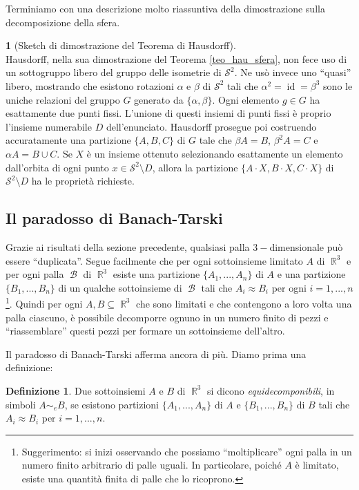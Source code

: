 \documentclass[12pt,a4paper]{report}
\theoremstyle{definition}
\newtheorem{defn}[teo]{Definizione}  %
\theoremstyle{num.custom-title}
\newtheorem{teo_custom-title}[teo]{} %
\DeclareMathOperator{\id}{id}
\DeclareMathOperator{\B}{\mathcal{B}}
\DeclareMathOperator{\R}{\mathbb{R}}
\DeclareMathOperator{\sm}{\setminus}
\renewcommand{\S}{\mathcal{S}}
\begin{document}
Terminiamo con una descrizione molto riassuntiva della dimostrazione sulla decomposizione della sfera.

\begin{teo_custom-title}[Sketch di dimostrazione del Teorema di Hausdorff]\ \\
Hausdorff, nella sua dimostrazione del Teorema \ref{teo_hau_sfera}, non fece uso di un sottogruppo libero del gruppo delle isometrie di $\S^2$. Ne usò invece uno ``quasi'' libero, mostrando che esistono rotazioni $\alpha$ e $\beta$ di $\S^2$ tali che $\alpha^2=\id=\beta^3$ sono le uniche relazioni del gruppo $G$ generato da $\{\alpha,\beta\}$. Ogni elemento $g \in G$ ha esattamente due punti fissi. L'unione di questi insiemi di punti fissi è proprio l'insieme numerabile $D$ dell'enunciato. Hausdorff prosegue poi costruendo accuratamente una partizione $\{A,B,C\}$ di $G$ tale che $\beta A = B$, $\beta^2 A = C$ e $\alpha A = B \cup C$. Se $X$ è un insieme ottenuto selezionando esattamente un elemento dall'orbita di ogni punto $x \in \S^2 \sm D$, allora la partizione $\{A \cdot X, B \cdot X, C \cdot X\}$ di $\S^2 \sm D$ ha le proprietà richieste.
\end{teo_custom-title}

\subsection{Il paradosso di Banach-Tarski}

Grazie ai risultati della sezione precedente, qualsiasi palla $3-$dimensionale può essere ``duplicata''. Segue facilmente che per ogni sottoinsieme limitato $A$ di $\R^3$ e per ogni palla $\B$ di $\R^3$ esiste una partizione $\{A_1,...,A_n\}$ di $A$ e una partizione $\{B_1,...,B_n\}$ di un qualche sottoinsieme di $\B$ tali che $A_i \approx B_i$ per ogni $i=1,...,n$ \footnote{Suggerimento: si inizi osservando che possiamo ``moltiplicare'' ogni palla in un numero finito arbitrario di palle uguali. In particolare, poiché $A$ è limitato, esiste una quantità finita di palle che lo ricoprono.}. Quindi per ogni $A,B \subseteq \R^3$ che sono limitati e che contengono a loro volta una palla ciascuno, è possibile decomporre ognuno in un numero finito di pezzi e ``riassemblare'' questi pezzi per formare un sottoinsieme dell'altro.

Il paradosso di Banach-Tarski afferma ancora di più. Diamo prima una definizione:

\begin{defn}
Due sottoinsiemi $A$ e $B$ di $\R^3$ si dicono \emph{equidecomponibili}, in simboli $A \sim_e B$, se esistono partizioni $\{A_1,...,A_n\}$ di $A$ e $\{B_1,...,B_n\}$ di $B$ tali che $A_i \approx B_i$ per $i=1,...,n$.
\end{defn}
\end{document}
